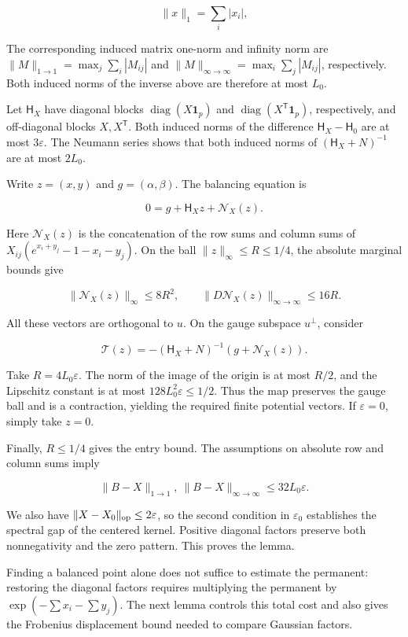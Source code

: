 \documentclass[11pt,a4paper]{article}
\begin{document}
\[
\|x\|_1=\sum_i|x_i|,
\]

The corresponding induced matrix one-norm and infinity norm are \(\|M\|_{1\to1}=\max_j\sum_i|M_{ij}|\) and \(\|M\|_{\infty\to\infty}=\max_i\sum_j|M_{ij}|\), respectively. Both induced norms of the inverse above are therefore at most \(L_0\).

Let \(\mathsf H_X\) have diagonal blocks \(\operatorname{diag}(X\mathbf 1_p)\) and \(\operatorname{diag}(X^{\mathsf T}\mathbf 1_p)\), respectively, and off-diagonal blocks \(X,X^{\mathsf T}\). Both induced norms of the difference \(\mathsf H_X-\mathsf H_0\) are at most \(3\varepsilon\). The Neumann series shows that both induced norms of \((\mathsf H_X+N)^{-1}\) are at most \(2L_0\).

Write \(z=(x,y)\) and \(g=(\alpha,\beta)\). The balancing equation is

\[
0=g+\mathsf H_Xz+\mathcal N_X(z).
\]

Here \(\mathcal N_X(z)\) is the concatenation of the row sums and column sums of \(X_{ij}(e^{x_i+y_j}-1-x_i-y_j)\). On the ball \(\|z\|_\infty\le R\le1/4\), the absolute marginal bounds give

\[
\|\mathcal N_X(z)\|_\infty\le8R^2,\qquad \|D\mathcal N_X(z)\|_{\infty\to\infty}\le16R.
\]

All these vectors are orthogonal to \(u\). On the gauge subspace \(u^\perp\), consider

\[
\mathcal T(z)=-(\mathsf H_X+N)^{-1}(g+\mathcal N_X(z)).
\]

Take \(R=4L_0\varepsilon\). The norm of the image of the origin is at most \(R/2\), and the Lipschitz constant is at most \(128L_0^2\varepsilon\le1/2\). Thus the map preserves the gauge ball and is a contraction, yielding the required finite potential vectors. If \(\varepsilon=0\), simply take \(z=0\).

Finally, \(R\le1/4\) gives the entry bound. The assumptions on absolute row and column sums imply

\[
\|B-X\|_{1\to1},\ \|B-X\|_{\infty\to\infty}\le32L_0\varepsilon.
\]

We also have \(\|X-X_0\|_{\rm op}\le2\varepsilon\), so the second condition in \(\varepsilon_0\) establishes the spectral gap of the centered kernel. Positive diagonal factors preserve both nonnegativity and the zero pattern. This proves the lemma.

Finding a balanced point alone does not suffice to estimate the permanent: restoring the diagonal factors requires multiplying the permanent by \(\exp(-\sum x_i-\sum y_j)\). The next lemma controls this total cost and also gives the Frobenius displacement bound needed to compare Gaussian factors.
\end{document}
